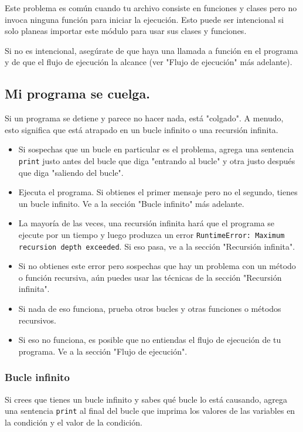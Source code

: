 Este problema es común cuando tu archivo consiste en funciones y clases pero no invoca ninguna función para iniciar la ejecución. Esto puede ser intencional si solo planeas importar este módulo para usar sus clases y funciones.

Si no es intencional, asegúrate de que haya una llamada a función en el programa y de que el flujo de ejecución la alcance (ver "Flujo de ejecución" más adelante).

\subsection{Mi programa se cuelga.}

Si un programa se detiene y parece no hacer nada, está "colgado". A menudo, esto significa que está atrapado en un bucle infinito o una recursión infinita.

\begin{itemize}
    \item Si sospechas que un bucle en particular es el problema, agrega una sentencia \texttt{print} justo antes del bucle que diga "entrando al bucle" y otra justo después que diga "saliendo del bucle".
    \item Ejecuta el programa. Si obtienes el primer mensaje pero no el segundo, tienes un bucle infinito. Ve a la sección "Bucle infinito" más adelante.
    \item La mayoría de las veces, una recursión infinita hará que el programa se ejecute por un tiempo y luego produzca un error \texttt{RuntimeError: Maximum recursion depth exceeded}. Si eso pasa, ve a la sección "Recursión infinita".
    \item Si no obtienes este error pero sospechas que hay un problema con un método o función recursiva, aún puedes usar las técnicas de la sección "Recursión infinita".
    \item Si nada de eso funciona, prueba otros bucles y otras funciones o métodos recursivos.
    \item Si eso no funciona, es posible que no entiendas el flujo de ejecución de tu programa. Ve a la sección "Flujo de ejecución".
\end{itemize}

\subsubsection{Bucle infinito}

Si crees que tienes un bucle infinito y sabes qué bucle lo está causando, agrega una sentencia \texttt{print} al final del bucle que imprima los valores de las variables en la condición y el valor de la condición.

